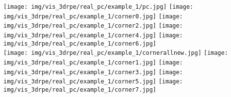 \documentclass[10pt,twocolumn,letterpaper]{article}
\begin{document}
\begin{figure*}[t]
\centering
\texttt{[image: img/vis\_3drpe/real\_pc/example\_1/pc.jpg]}
\hfill
\texttt{[image: img/vis\_3drpe/real\_pc/example\_1/corner0.jpg]}
\hfill
\texttt{[image: img/vis\_3drpe/real\_pc/example\_1/corner2.jpg]}
\hfill
\texttt{[image: img/vis\_3drpe/real\_pc/example\_1/corner4.jpg]}
\hfill
\texttt{[image: img/vis\_3drpe/real\_pc/example\_1/corner6.jpg]}
\hfill
\\
\texttt{[image: img/vis\_3drpe/real\_pc/example\_1/cornerallnew.jpg]} 
\hfill
\texttt{[image: img/vis\_3drpe/real\_pc/example\_1/corner1.jpg]}  
\hfill
\texttt{[image: img/vis\_3drpe/real\_pc/example\_1/corner3.jpg]}
\hfill
\texttt{[image: img/vis\_3drpe/real\_pc/example\_1/corner5.jpg]}
\hfill
\texttt{[image: img/vis\_3drpe/real\_pc/example\_1/corner7.jpg]}  \\
\vspace{10mm}


\end{figure*}
\end{document}
